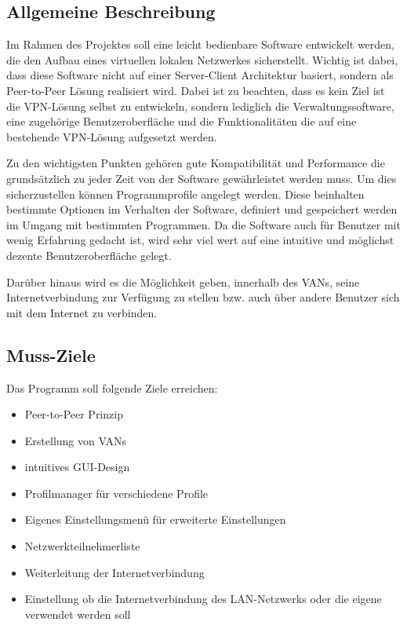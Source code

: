 \documentclass[a4paper,12pt]{scrreprt}
\begin{document}
		\subsection{Allgemeine Beschreibung}
		
		Im Rahmen des Projektes soll eine leicht bedienbare Software entwickelt werden, die den Aufbau eines virtuellen lokalen Netzwerkes sicherstellt. Wichtig ist dabei, dass diese Software nicht auf einer Server-Client Architektur basiert, sondern als Peer-to-Peer Lösung realisiert wird. Dabei ist zu beachten, dass es kein Ziel ist die VPN-Lösung selbst zu entwickeln, sondern lediglich die Verwaltungssoftware, eine zugehörige Benutzeroberfläche und die Funktionalitäten die auf eine bestehende VPN-Lösung aufgesetzt werden.
		
		Zu den wichtigsten Punkten gehören gute Kompatibilität und Performance die grundsätzlich zu jeder Zeit von der Software gewährleistet werden muss. Um dies sicherzustellen können Programmprofile angelegt werden. Diese beinhalten bestimmte Optionen im Verhalten der Software, definiert und gespeichert werden im Umgang mit bestimmten Programmen. Da die Software auch für Benutzer mit wenig Erfahrung gedacht ist, wird sehr viel wert auf eine intuitive und möglichst dezente Benutzeroberfläche gelegt.
		
		Darüber hinaus wird es die Möglichkeit geben, innerhalb des VANs, seine Internetverbindung zur Verfügung zu stellen bzw. auch über andere Benutzer sich mit dem Internet zu verbinden. 
		
			
		\subsection{Muss-Ziele}
		Das Programm soll folgende Ziele erreichen:\\
		\begin{itemize}
		\item Peer-to-Peer Prinzip
		\item Erstellung von VANs
		\item intuitives GUI-Design
		\item Profilmanager für verschiedene Profile
		\item Eigenes Einstellungsmenü für erweiterte Einstellungen
		\item Netzwerkteilnehmerliste
		\item Weiterleitung der Internetverbindung
		\item Einstellung ob die Internetverbindung des LAN-Netzwerks oder die eigene verwendet werden soll
		
		\end{itemize}
		
\end{document}

